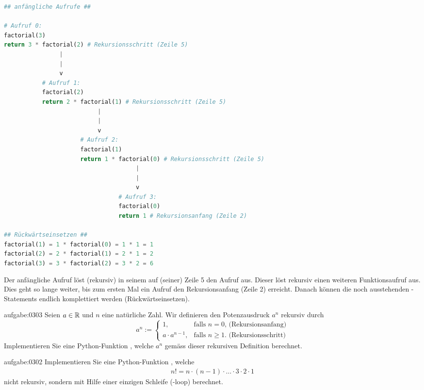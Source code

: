 \lstset{basicstyle=\ttfamily\footnotesize}
\begin{lstlisting}[language=Python,caption=rekursive Berechnung der Fakultät,label=listing:lowtech]
## anfängliche Aufrufe ##

# Aufruf 0:
factorial(3)
return 3 * factorial(2) # Rekursionsschritt (Zeile 5)
                |
                |
                v 
           # Aufruf 1:
           factorial(2)
           return 2 * factorial(1) # Rekursionsschritt (Zeile 5)
                           |
                           |
                           v
                      # Aufruf 2:
                      factorial(1)
                      return 1 * factorial(0) # Rekursionsschritt (Zeile 5)
                                      |
                                      |
                                      v
                                 # Aufruf 3:
                                 factorial(0)
                                 return 1 # Rekursionsanfang (Zeile 2)

## Rückwärtseinsetzen ##
factorial(1) = 1 * factorial(0) = 1 * 1 = 1
factorial(2) = 2 * factorial(1) = 2 * 1 = 2
factorial(3) = 3 * factorial(2) = 3 * 2 = 6
\end{lstlisting}
\lstset{style=mystyle}
\noindent
Der anfängliche Aufruf  löst (rekursiv) in seinem  auf (seiner) Zeile 5 den Aufruf  aus. Dieser löst rekursiv einen weiteren Funktionsaufruf aus. Dies geht so lange weiter, bis zum ersten Mal ein Aufruf den Rekursionsanfang (Zeile 2) erreicht. Danach können die noch ausstehenden -Statements endlich komplettiert werden (Rückwärtseinsetzen).

\clearpage

\begin{aufgabe}{aufgabe:0303}
Seien $a\in\mathbb{R}$ und $n$ eine natürliche Zahl. Wir definieren den Potenzausdruck $a^n$ rekursiv durch
\[
  a^n := 
  \begin{cases}
    1, &\text{falls $n=0$, (Rekursionsanfang)} \\
    a\cdot a^{n-1}, & \text{falls  $n\geq 1$. (Rekursionsschritt)}
  \end{cases}
\]
Implementieren Sie eine Python-Funktion , welche $a^n$ gemäss dieser rekursiven Definition berechnet.
\end{aufgabe}

\begin{aufgabe}{aufgabe:0302}
Implementieren Sie eine Python-Funktion , welche
\begin{align*}
    n! = n\cdot (n-1)\cdot\ldots\cdot 3\cdot 2\cdot 1
\end{align*}
nicht rekursiv, sondern mit Hilfe einer einzigen Schleife (-loop) berechnet.
\end{aufgabe}


